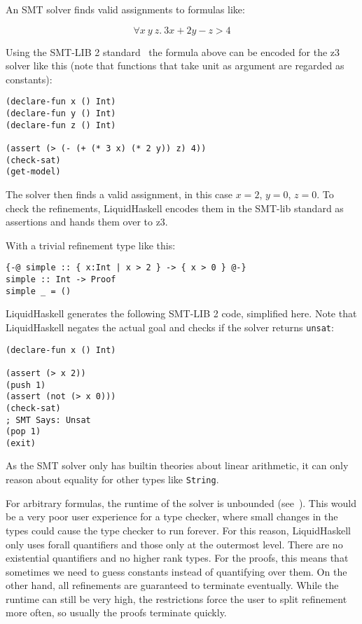 \documentclass[acmlarge,screen,authorversion=true,nonacm=true]{acmart}
\begin{document}
An SMT solver finds valid assignments to formulas like:

\begin{equation}
\forall x\ y\ z.\ 3x + 2y - z > 4
\end{equation}

Using the SMT-LIB 2 standard~\cite{smt-lib} the formula above can be encoded for the z3 solver like this (note that functions that take unit as argument are regarded as constants):

\begin{lstlisting}
(declare-fun x () Int)
(declare-fun y () Int)
(declare-fun z () Int)

(assert (> (- (+ (* 3 x) (* 2 y)) z) 4))
(check-sat)
(get-model)
\end{lstlisting}

The solver then finds a valid assignment, in this case $x = 2$, $y = 0$, $z = 0$. To check the refinements, LiquidHaskell encodes them in the SMT-lib standard as assertions and hands them over to z3.

With a trivial refinement type like this:
\begin{lstlisting}
{-@ simple :: { x:Int | x > 2 } -> { x > 0 } @-}
simple :: Int -> Proof
simple _ = ()
\end{lstlisting}

LiquidHaskell generates the following SMT-LIB 2 code, simplified here. Note that LiquidHaskell negates the actual goal and checks if the solver returns \texttt{unsat}:

\begin{lstlisting}
(declare-fun x () Int)

(assert (> x 2))
(push 1)
(assert (not (> x 0)))
(check-sat)
; SMT Says: Unsat
(pop 1)
(exit)
\end{lstlisting}

As the SMT solver only has builtin theories about linear arithmetic, it can only reason about equality for other types like \texttt{String}.

For arbitrary formulas, the runtime of the solver is unbounded (see~\cite{lh_quantifiers}). This would be a very poor user experience for a type checker, where small changes in the types could cause the type checker to run forever. For this reason, LiquidHaskell only uses forall quantifiers and those only at the outermost level. There are no existential quantifiers and no higher rank types. For the proofs, this means that sometimes we need to guess constants instead of quantifying over them. On the other hand, all refinements are guaranteed to terminate eventually. While the runtime can still be very high, the restrictions force the user to split refinement more often, so usually the proofs terminate quickly.
\end{document}
